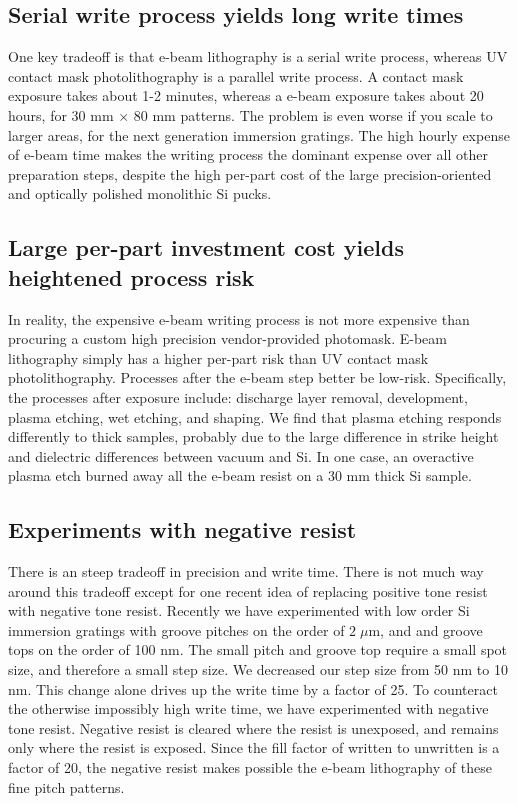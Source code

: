 \documentclass[]{spie}  %
\begin{document}
\subsection{Serial write process yields long write times}
One key tradeoff is that e-beam lithography is a serial write process, whereas UV contact mask photolithography is a parallel write process.  A contact mask exposure takes about 1-2 minutes, whereas a e-beam exposure takes about 20 hours, for 30 mm $\times$ 80 mm patterns.  The problem is even worse if you scale to larger areas, for the next generation immersion gratings.  The high hourly expense of e-beam time makes the writing process the dominant expense over all other preparation steps, despite the high per-part cost of the large precision-oriented and optically polished monolithic Si pucks.  

\subsection{Large per-part investment cost yields heightened process risk}
In reality, the expensive e-beam writing process is not more expensive than procuring a custom high precision vendor-provided photomask.  E-beam lithography simply has a higher per-part risk than UV contact mask photolithography.  Processes after the e-beam step better be low-risk.  Specifically, the processes after exposure include: discharge layer removal, development, plasma etching, wet etching, and shaping.  We find that plasma etching responds differently to thick samples, probably due to the large difference in strike height and dielectric differences between vacuum and Si.  In one case, an overactive plasma etch burned away all the e-beam resist on a 30 mm thick Si sample.

\subsection{Experiments with negative resist}
There is an steep tradeoff in precision and write time.  There is not much way around this tradeoff except for one recent idea of replacing positive tone resist with negative tone resist.  Recently we have experimented with low order Si immersion gratings with groove pitches on the order of $2 \; \mu$m, and and groove tops on the order of 100 nm.   The small pitch and groove top require a small spot size, and therefore a small step size.  We decreased our step size from 50 nm to 10 nm.  This change alone drives up the write time by a factor of 25.  To counteract the otherwise impossibly high write time, we have experimented with negative tone resist.  Negative resist is cleared where the resist is unexposed, and remains only where the resist is exposed.  Since the fill factor of written to unwritten is a factor of 20, the negative resist makes possible the e-beam lithography of these fine pitch patterns.  
\end{document}
